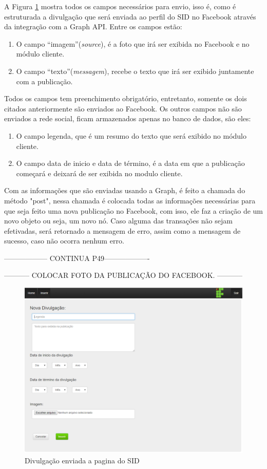 A Figura \ref{fig:imgadministrador1} mostra todos os campos necessários para envio, isso é, como é estruturada a divulgação que será enviada ao perfil do SID no Facebook através da integração com a Graph API. Entre os campos estão: 
\begin{enumerate}[label=\Roman*)]
	\item O campo ``imagem''(\textit{source}), é a foto que irá ser exibida no Facebook e no módulo cliente.
	\item O campo ``texto''(\textit{messagem}), recebe o texto que irá ser exibido juntamente com a publicação.
\end{enumerate}

Todos os campos tem preenchimento obrigatório, entretanto, somente os dois citados anteriormente são enviados ao Facebook. Os outros campos não são enviados a rede social, ficam armazenados apenas no banco de dados, são eles:
\begin{enumerate}[label=\Roman*)]
	\item O campo legenda, que é um resumo do texto que será exibido no módulo cliente.
	\item O campo data de inicio e data de término, é a data em que a publicação começará e deixará de ser exibida no modulo cliente.
\end{enumerate}

Com as informações que são enviadas usando a Graph, é feito a chamada do método "post", nessa chamada é colocada todas as informações necessárias para que seja feito uma nova publicação no Facebook, com isso, ele faz a criação de um novo objeto ou seja, um novo nó. Caso alguma das transações não sejam efetivadas, será retornado a mensagem de erro, assim como a mensagem de sucesso, caso não ocorra nenhum erro.

------------------ CONTINUA  P49-------------------

----------- COLOCAR FOTO DA PUBLICAÇÃO DO FACEBOOK. -----------

 \begin{figure}[H]
\centering
\includegraphics[scale=0.6]{figuras/administrador1}
\caption{Divulgação enviada a pagina do SID}
\label{fig:imgadministrador1}
\end{figure}